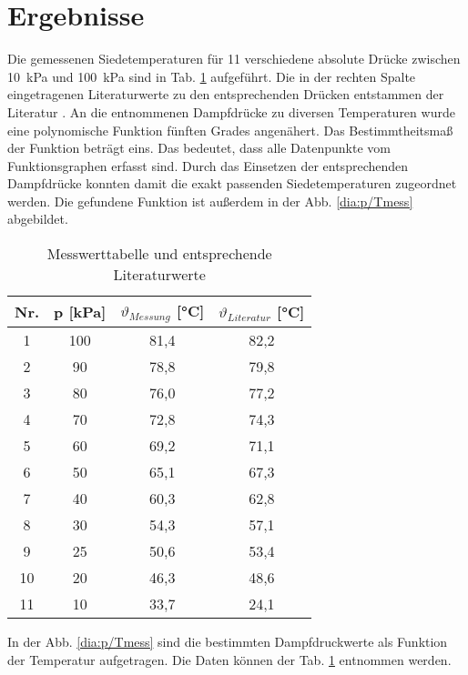 \section{Ergebnisse}
\label{sec:ergebnisse}
Die gemessenen Siedetemperaturen für 11 verschiedene absolute Drücke zwischen \SI{10}{\kilo\pascal} und \SI{100}{\kilo\pascal} sind in Tab. \ref{tab:messwerttabelle} aufgeführt. Die in der rechten Spalte eingetragenen Literaturwerte zu den entsprechenden Drücken entstammen der Literatur \cite{lideCRCHandbookChemistry1994}. An die entnommenen Dampfdrücke zu diversen Temperaturen wurde eine polynomische Funktion fünften Grades angenähert. Das Bestimmtheitsmaß der Funktion beträgt eins. Das bedeutet, dass alle Datenpunkte vom Funktionsgraphen erfasst sind. Durch das Einsetzen der entsprechenden Dampfdrücke konnten damit die exakt passenden Siedetemperaturen zugeordnet werden. Die gefundene Funktion ist außerdem in der Abb. \ref{dia:p/Tmess} abgebildet.
\vspace*{-5.5mm}
\renewcommand{\arraystretch}{1.2}
\begin{table}[h!]
	\centering
	\caption{Messwerttabelle und entsprechende Literaturwerte}
	\label{tab:messwerttabelle}
	\begin{tabular}{|c|c|c|c|}
		\hline
		\textbf{Nr.} &\textbf{p [\si{\kilo\pascal}]}	& \textbf{$\vartheta_{Messung}$ [\si{\degreeCelsius}]} &\textbf{$\vartheta_{Literatur}$ [\si{\degreeCelsius}] \cite{lideCRCHandbookChemistry1994}}	 \\
		\hline
		1& 100 & 81,4 & 82,2 \\
		2& 90 & 78,8 & 79,8 \\
		3& 80 & 76,0 & 77,2\\
		4& 70 & 72,8 & 74,3\\
		5& 60 & 69,2 & 71,1\\
		6& 50 & 65,1 & 67,3\\
		7& 40 & 60,3 & 62,8\\
		8& 30 & 54,3 & 57,1\\
		9& 25 & 50,6 &  53,4\\
		10& 20 & 46,3 & 48,6\\
		11& 10 & 33,7 & 24,1\\
		\hline
	\end{tabular}
\end{table}
\FloatBarrier
\vspace*{-2.5mm}

In der Abb. \ref{dia:p/Tmess} sind die bestimmten Dampfdruckwerte als Funktion der Temperatur aufgetragen. Die Daten können der Tab. \ref{tab:messwerttabelle} entnommen werden.

